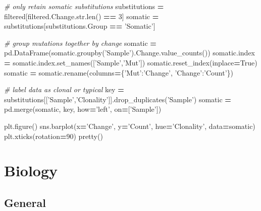 \documentclass[]{book}
\newenvironment{Shaded}{\begin{snugshade}}{\end{snugshade}}
\newcommand{\BuiltInTok}[1]{#1}
\newcommand{\CommentTok}[1]{\textcolor[rgb]{0.56,0.35,0.01}{\textit{#1}}}
\newcommand{\DecValTok}[1]{\textcolor[rgb]{0.00,0.00,0.81}{#1}}
\newcommand{\NormalTok}[1]{#1}
\newcommand{\OperatorTok}[1]{\textcolor[rgb]{0.81,0.36,0.00}{\textbf{#1}}}
\newcommand{\StringTok}[1]{\textcolor[rgb]{0.31,0.60,0.02}{#1}}
\newcommand{\VariableTok}[1]{\textcolor[rgb]{0.00,0.00,0.00}{#1}}
\begin{document}
\begin{Shaded}
\begin{Highlighting}[]
\CommentTok{# only retain somatic substitutions}
\NormalTok{substitutions }\OperatorTok{=}\NormalTok{ filtered[filtered.Change.}\BuiltInTok{str}\NormalTok{.}\BuiltInTok{len}\NormalTok{() }\OperatorTok{==} \DecValTok{3}\NormalTok{]}
\NormalTok{somatic }\OperatorTok{=}\NormalTok{ substitutions[substitutions.Group }\OperatorTok{==} \StringTok{'Somatic'}\NormalTok{]}

\CommentTok{# group mutations together by change}
\NormalTok{somatic }\OperatorTok{=}\NormalTok{ pd.DataFrame(somatic.groupby(}\StringTok{'Sample'}\NormalTok{).Change.value_counts())}
\NormalTok{somatic.index }\OperatorTok{=}\NormalTok{ somatic.index.set_names([}\StringTok{'Sample'}\NormalTok{,}\StringTok{'Mut'}\NormalTok{])}
\NormalTok{somatic.reset_index(inplace}\OperatorTok{=}\VariableTok{True}\NormalTok{)}
\NormalTok{somatic }\OperatorTok{=}\NormalTok{ somatic.rename(columns}\OperatorTok{=}\NormalTok{\{}\StringTok{'Mut'}\NormalTok{:}\StringTok{'Change'}\NormalTok{, }\StringTok{'Change'}\NormalTok{:}\StringTok{'Count'}\NormalTok{\})}

\CommentTok{# label data as clonal or typical}
\NormalTok{key }\OperatorTok{=}\NormalTok{ substitutions[[}\StringTok{'Sample'}\NormalTok{,}\StringTok{'Clonality'}\NormalTok{]].drop_duplicates(}\StringTok{'Sample'}\NormalTok{)}
\NormalTok{somatic }\OperatorTok{=}\NormalTok{ pd.merge(somatic, key, how}\OperatorTok{=}\StringTok{'left'}\NormalTok{, on}\OperatorTok{=}\NormalTok{[}\StringTok{'Sample'}\NormalTok{])}

\NormalTok{plt.figure()}
\NormalTok{sns.barplot(x}\OperatorTok{=}\StringTok{'Change'}\NormalTok{, y}\OperatorTok{=}\StringTok{'Count'}\NormalTok{, hue}\OperatorTok{=}\StringTok{'Clonality'}\NormalTok{, data}\OperatorTok{=}\NormalTok{somatic)}
\NormalTok{plt.xticks(rotation}\OperatorTok{=}\DecValTok{90}\NormalTok{)}
\NormalTok{pretty()}
\end{Highlighting}
\end{Shaded}

\hypertarget{biology}{%
\chapter{Biology}\label{biology}}

\hypertarget{general-1}{%
\section{General}\label{general-1}}
\end{document}
